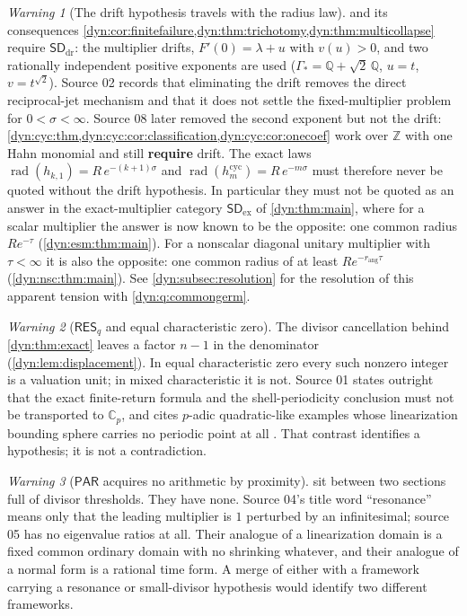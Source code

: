 \documentclass[11pt,letterpaper]{article}
\theoremstyle{definition}
\theoremstyle{remark}
\newtheorem{warning}[warning]{Warning}
\newcommand{\C}{\mathbb C}
\newcommand{\Q}{\mathbb Q}
\newcommand{\Z}{\mathbb Z}
\newcommand{\rad}{\operatorname{rad}}
\newcommand{\sddr}{\mathsf{SD}_{\mathrm{dr}}}
\newcommand{\sdex}{\mathsf{SD}_{\mathrm{ex}}}
\newcommand{\resq}{\mathsf{RES}_q}
\newcommand{\pares}{\mathsf{PAR}}
\newcommand{\rang}{r_{\mathrm{ang}}}
\numberwithin{equation}{section}
\begin{document}
\begin{warning}[The drift hypothesis travels with the radius law]
\label{dyn:warn:drift}
 and its consequences
\cref{dyn:cor:finitefailure,dyn:thm:trichotomy,dyn:thm:multicollapse}
require $\sddr$: the multiplier drifts, $F'(0)=\lambda+u$ with
$v(u)>0$, and two rationally independent positive exponents are used
($\Gamma_{*}=\Q+\sqrt2\,\Q$, $u=t$, $v=t^{\sqrt2}$). Source 02 records
that eliminating the drift removes the direct reciprocal-jet mechanism and
that it does not settle the fixed-multiplier problem for
$0<\sigma<\infty$. Source 08 later removed the second exponent but not the
drift: \cref{dyn:cyc:thm,dyn:cyc:cor:classification,dyn:cyc:cor:onecoef}
work over $\Z$ with one Hahn monomial and still \textbf{require} drift. The
exact laws $\rad(h_{k,1})=R\,e^{-(k+1)\sigma}$ and
$\rad(h^{\mathrm{cyc}}_m)=R\,e^{-m\sigma}$ must therefore never be quoted
without the drift hypothesis. In particular they must not be quoted as an
answer in the exact-multiplier category $\sdex$ of \cref{dyn:thm:main},
where for a scalar multiplier the answer is now known to be the opposite:
one common radius $Re^{-\tau}$ (\cref{dyn:esm:thm:main}). For a nonscalar
diagonal unitary multiplier with $\tau<\infty$ it is also the opposite: one
common radius of at least $Re^{-\rang\tau}$ (\cref{dyn:nsc:thm:main}). See
\cref{dyn:subsec:resolution} for the resolution of this apparent tension
with \cref{dyn:q:commongerm}.
\end{warning}

\begin{warning}[$\resq$ and equal characteristic zero]
\label{dyn:warn:charzero}
The divisor cancellation behind \cref{dyn:thm:exact} leaves a factor
$n-1$ in the denominator (\cref{dyn:lem:displacement}). In equal
characteristic zero every such nonzero integer is a valuation unit; in
mixed characteristic it is not. Source 01 states outright that the exact
finite-return formula and the shell-periodicity conclusion must not be
transported to $\C_p$, and cites $p$-adic quadratic-like examples whose
linearization bounding sphere carries no periodic point at all
\cite[Cor.~C]{LindahlPadic}. That contrast identifies a hypothesis; it is
not a contradiction.
\end{warning}

\begin{warning}[$\pares$ acquires no arithmetic by proximity]
\label{dyn:warn:parabolic}
 sit between two
sections full of divisor thresholds. They have none. Source 04's title
word ``resonance'' means only that the leading multiplier is $1$ perturbed
by an infinitesimal; source 05 has no eigenvalue ratios at all. Their
analogue of a linearization domain is a fixed common ordinary domain with
no shrinking whatever, and their analogue of a normal form is a rational
time form. A merge of either with a framework carrying a resonance or
small-divisor hypothesis would identify two different frameworks.
\end{warning}
\end{document}
